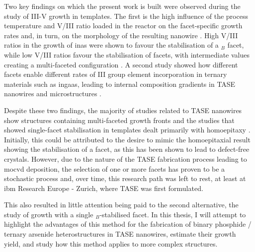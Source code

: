 Two key findings on which the present work is built were observed during the study of III-V growth in templates. The first is the high influence of the process temperature and V/III ratio loaded in the reactor on the facet-specific growth rates and, in turn, on the morphology of the resulting nanowire \cite{Goswami2020}. High V/III ratios in the growth of \acs{inas} were shown to favour the stabilisation of a \(_B\) facet, while low V/III ratios favour the stabilisation of  facets, with intermediate values creating a multi-faceted configuration \cite{Borg2015}. A second study showed how different facets enable different rates of III group element incorporation in ternary materials such as \acs{ingaas}, leading to internal composition gradients in \acs{TASE} nanowires and microstructures \cite{Borg2019}.

Despite these two findings, the majority of studies related to \acs{TASE} nanowires show structures containing multi-faceted growth fronts \cite{Knoedler2017, Han2016, Yan2021, Scherrer2024, Xue2021, Wen2022} and the studies that showed single-facet stabilisation in templates dealt primarily with homoepitaxy \cite{Brunelli2019}. Initially, this could be attributed to the desire to mimic the homoepitaxial result showing the stabilisation of a  facet, as this has been shown to lead to defect-free crystals. However, due to the nature of the \acs{TASE} fabrication process leading to \acs{mocvd} deposition, the selection of one or more  facets has proven to be a stochastic process \cite{Knoedler2017} and, over time, this research path was left to rest, at least at \acs{ibm} Research Europe - Zurich, where \acs{TASE} was first formulated.

This also resulted in little attention being paid to the second alternative, the study of growth with a single \(_B\)-stabilised facet. In this thesis, I will attempt to highlight the advantages of this method for the fabrication of binary phosphide / ternary arsenide heterostructures in \acs{TASE} nanowires, estimate their growth yield, and study how this method applies to more complex structures.


